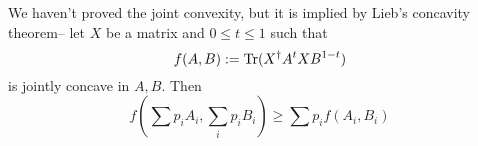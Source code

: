 We haven't proved the joint convexity, but it is implied by Lieb's concavity theorem-- let $X$ be a matrix and $0\leq t \leq 1$ such that
\begin{equation}
    f(A,B) := \operatorname{Tr}(X^\dagger A^t X B^{1-t})
\end{equation}
is jointly concave in $A,B$. Then
\begin{equation}
    f(\sum p_i A_i, \sum_i p_i B_i) \geq \sum p_i f(A_i, B_i)
\end{equation}
